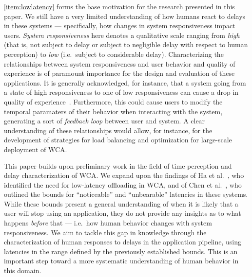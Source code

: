 \documentclass[10pt,letterpaper]{article}
\begin{document}
\cref{item:lowlatency} forms the base motivation for the research presented in this paper.
We still have a very limited understanding of how humans react to delays in these systems --- specifically, how changes in system responsiveness impact users.
\emph{System responsiveness} here denotes a qualitative scale ranging from \emph{high} (that is, not subject to delay or subject to negligible delay with respect to human perception) to \emph{low} (i.e.\ subject to considerable delay).
Characterizing the relationships between system responsiveness and user behavior and quality of experience is of paramount importance for the design and evaluation of these applications.
It is generally acknowledged, for instance, that a system going from a state of high responsiveness to one of low responsiveness can cause a drop in quality of experience~\cite{dabrowsky:2011:40years}. 
Furthermore, this could cause users to modify the temporal paramaters of their behavior when interacting with the system, generating a sort of \emph{feedback loop} between user and system.
A clear understanding of these relationships would allow, for instance, for the development of strategies for load balancing and optimization for large-scale deployment of WCA.\@

This paper builds upon preliminary work in the field of time perception and delay characterization of WCA.\@
We expand upon the findings of Ha et al.~\cite{Ha:TowardsWearableCogAssist}, who identified the need for low-latency offloading in WCA, and of Chen et al.~\cite{Chen:AnEmpiricalStudyOfLatency}, who outlined the bounds for ``noticeable'' and ``unbearable'' latencies in these systems.
While these bounds present a general understanding of when it is likely that a user will stop using an application, they do not provide any insights as to what happens \emph{before} that --- i.e.\ how human behavior changes with system responsiveness.
We aim to tackle this gap in knowledge through the characterization of human responses to delays in the application pipeline, using latencies in the range defined by the previously established bounds.
This is an important step toward a more systematic understanding of human behavior in this domain.
\end{document}
